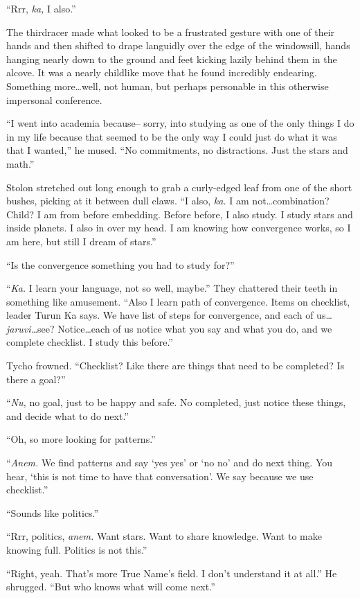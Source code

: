 ``Rrr, \emph{ka,} I also.''

The thirdracer made what looked to be a frustrated gesture with one of their hands and then shifted to drape languidly over the edge of the windowsill, hands hanging nearly down to the ground and feet kicking lazily behind them in the alcove. It was a nearly childlike move that he found incredibly endearing. Something more\ldots well, not human, but perhaps personable in this otherwise impersonal conference.

``I went into academia because-- sorry, into studying as one of the only things I do in my life because that seemed to be the only way I could just do what it was that I wanted,'' he mused. ``No commitments, no distractions. Just the stars and math.''

Stolon stretched out long enough to grab a curly-edged leaf from one of the short bushes, picking at it between dull claws. ``I also, \emph{ka.} I am not\ldots combination? Child? I am from before embedding. Before before, I also study. I study stars and inside planets. I also in over my head. I am knowing how convergence works, so I am here, but still I dream of stars.''

``Is the convergence something you had to study for?''

``\emph{Ka.} I learn your language, not so well, maybe.'' They chattered their teeth in something like amusement. ``Also I learn path of convergence. Items on checklist, leader Turun Ka says. We have list of steps for convergence, and each of us\ldots{}\emph{jaruvi}\ldots see? Notice\ldots each of us notice what you say and what you do, and we complete checklist. I study this before.''

Tycho frowned. ``Checklist? Like there are things that need to be completed? Is there a goal?''

``\emph{Nu,} no goal, just to be happy and safe. No completed, just notice these things, and decide what to do next.''

``Oh, so more looking for patterns.''

``\emph{Anem.} We find patterns and say `yes yes' or `no no' and do next thing. You hear, `this is not time to have that conversation'. We say because we use checklist.''

``Sounds like politics.''

``Rrr, politics, \emph{anem.} Want stars. Want to share knowledge. Want to make knowing full. Politics is not this.''

``Right, yeah. That's more True Name's field. I don't understand it at all.'' He shrugged. ``But who knows what will come next.''

